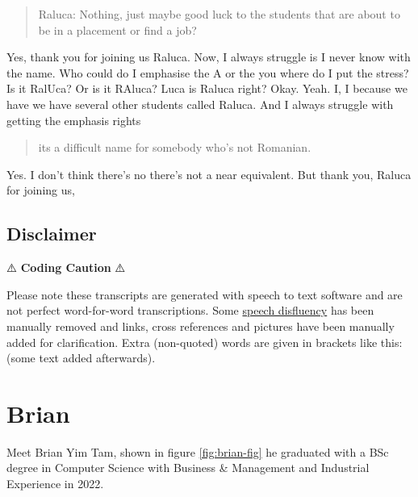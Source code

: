 \documentclass[
]{book}
\begin{document}
\begin{quote}
Raluca: Nothing, just maybe good luck to the students that are about to be in a placement or find a job?
\end{quote}

Yes, thank you for joining us Raluca. Now, I always struggle is I never know with the name. Who could do I emphasise the A or the you where do I put the stress? Is it RalUca? Or is it RAluca? Luca is Raluca right? Okay. Yeah. I, I because we have we have several other students called Raluca. And I always struggle with getting the emphasis rights

\begin{quote}
its a difficult name for somebody who's not Romanian.
\end{quote}

Yes. I don't think there's no there's not a near equivalent. But thank you, Raluca for joining us,

\hypertarget{disclaimer}{%
\section{Disclaimer}\label{disclaimer}}

⚠️ \textbf{Coding Caution} ⚠️

Please note these transcripts are generated with speech to text software and are not perfect word-for-word transcriptions. Some \href{https://en.wikipedia.org/wiki/Speech_disfluency}{speech disfluency} has been manually removed and links, cross references and pictures have been manually added for clarification. Extra (non-quoted) words are given in brackets like this: (some text added afterwards).

\hypertarget{brian}{%
\chapter{Brian}\label{brian}}

Meet Brian Yim Tam, shown in figure \ref{fig:brian-fig} he graduated with a BSc degree in Computer Science with Business \& Management and Industrial Experience in 2022.
\end{document}
